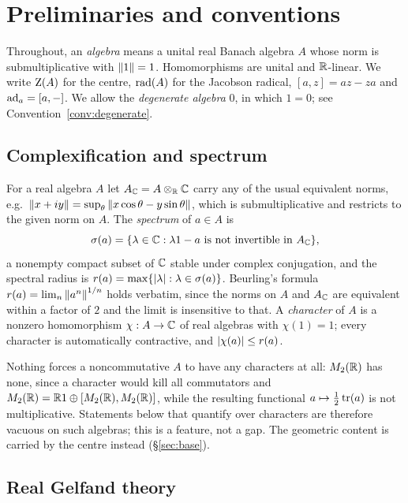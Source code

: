 \section{Preliminaries and conventions}
\label{sec:prelim}

\begin{convention}\label{conv:standing}
Throughout, an \emph{algebra} means a unital real Banach algebra $A$ whose norm
is submultiplicative with $\left\lVert1\right\rVert=1$.  Homomorphisms are unital and
$\mathbb{R}$-linear.  We write $\operatorname{Z}(A)$ for the centre, $\operatorname{rad}(A)$ for the Jacobson
radical, $[a,z]=az-za$ and $\operatorname{ad}_a=[a,-]$.  We allow the \emph{degenerate
algebra} $0$, in which $1=0$; see Convention~\ref{conv:degenerate}.
\end{convention}

\subsection{Complexification and spectrum}

For a real algebra $A$ let $A_{\mathbb{C}}=A\otimes_{\mathbb{R}}\mathbb{C}$ carry any of the usual
equivalent norms, e.g.\
$\left\lVert x+iy\right\rVert=\sup_{\theta}\left\lVert x\cos\theta-y\sin\theta\right\rVert$, which is
submultiplicative and restricts to the given norm on $A$.  The \emph{spectrum}
of $a\in A$ is
\[
  \spec(a)=\{\lambda\in\CC:\lambda1-a\ \text{is not invertible in}\ A_\CC\},
\]
a nonempty compact subset of $\mathbb{C}$ stable under complex conjugation, and the
spectral radius is $r(a)=\max\{\left\lvert\lambda\right\rvert:\lambda\in\operatorname{\sigma}(a)\}$.  Beurling's
formula $r(a)=\lim_n\left\lVert a^n\right\rVert^{1/n}$ holds verbatim, since the norms on $A$ and
$A_{\mathbb{C}}$ are equivalent within a factor of $2$ and the limit is insensitive to
that.  A \emph{character} of $A$ is a nonzero homomorphism $\chi:A\to\mathbb{C}$ of
real algebras with $\chi(1)=1$; every character is automatically contractive,
and $\left\lvert\chi(a)\right\rvert\le r(a)$.

\begin{remark}
Nothing forces a noncommutative $A$ to have any characters at all: $M_2(\mathbb{R})$
has none, since a character would kill all commutators and
$M_2(\mathbb{R})=\mathbb{R}1\oplus[M_2(\mathbb{R}),M_2(\mathbb{R})]$, while the resulting functional
$a\mapsto\tfrac12\operatorname{tr}(a)$ is not multiplicative.  Statements below that quantify
over characters are therefore vacuous on such algebras; this is a feature, not a
gap.  The geometric content is carried by the centre instead (\S\ref{sec:base}).
\end{remark}

\subsection{Real Gelfand theory}

